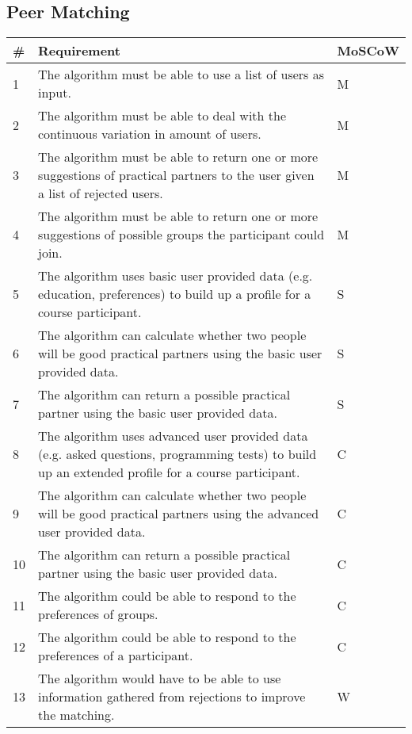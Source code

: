 \subsection{Peer Matching}
\begin{tabular}{ | p{0.5cm} | p{12cm} | p{2cm} | }
\hline
\textbf{\#} & \textbf{Requirement} & \textbf{MoSCoW} \\ \hline
1 & The algorithm must be able to use a list of users as input. & M \\ \hline
2 & The algorithm must be able to deal with the continuous variation in amount of users. & M \\ \hline
3 & The algorithm must be able to return one or more suggestions of practical partners to the user given a list of rejected users. & M \\ \hline
4 & The algorithm must be able to return one or more suggestions of possible groups the participant could join. & M \\ \hline
5 & The algorithm uses basic user provided data (e.g. education, preferences) to build up a profile for a course participant. & S \\ \hline
6 & The algorithm can calculate whether two people will be good practical partners using the basic user provided data. & S \\ \hline
7 & The algorithm can return a possible practical partner using the basic user provided data. & S \\ \hline
8 & The algorithm uses advanced user provided data (e.g. asked questions, programming tests) to build up an extended profile for a course participant. & C \\ \hline
9 & The algorithm can calculate whether two people will be good practical partners using the advanced user provided data. & C \\ \hline
10 & The algorithm can return a possible practical partner using the basic user provided data. & C \\ \hline
11 & The algorithm could be able to respond to the preferences of groups. & C \\ \hline
12 & The algorithm could be able to respond to the preferences of a participant. & C \\ \hline
13 & The algorithm would have to be able to use information gathered from rejections to improve the matching. & W \\
\hline
\end{tabular}


